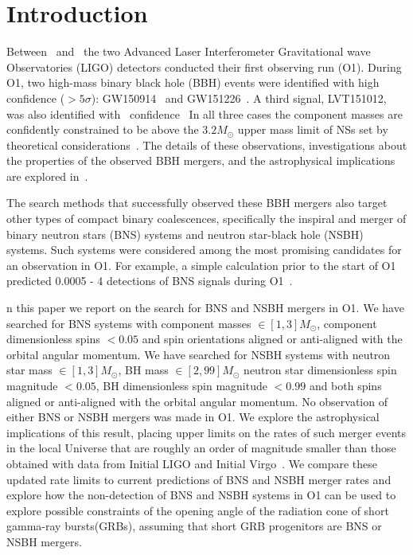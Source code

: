 

\section{Introduction}
Between \OoneSTART\ and \OoneEND\, the two Advanced Laser Interferometer Gravitational wave Observatories (LIGO) detectors conducted their first observing run (\ac{O1}).
During \ac{O1}, two high-mass binary black hole (\ac{BBH}) events
were identified with high confidence ($> 5 \sigma$): GW150914~\citep{Abbott:2016blz} and
GW151226~\citep{Abbott:2016nmj}. A third signal, LVT151012, was
also identified with \LVBLAHsignificance\ confidence~\citep{TheLIGOScientific:2016pea, TheLIGOScientific:2016qqj}
In all three cases the component masses are confidently constrained to be above the $3.2M_\odot$ upper mass limit of \acp{NS} set
by theoretical considerations~\citep{Rhoades:1974fn,TheLIGOScientific:2016wfe}.
The details of these observations, investigations about the properties
of the observed \ac{BBH} mergers, and the astrophysical implications are explored
in~\citep{TheLIGOScientific:2016wfe,Abbott:2016nhf,TheLIGOScientific:2016htt,TheLIGOScientific:2016src,TheLIGOScientific:2016pea, Abbott:2016izl}.

The search methods that successfully observed these \ac{BBH} mergers also target other types of compact
binary coalescences, specifically the inspiral and merger of binary neutron stars (\ac{BNS}) systems 
and neutron star-black hole (\ac{NSBH}) systems. Such systems were considered
among the most promising candidates for an observation in \ac{O1}. For example, a simple calculation
prior to the start of O1 predicted 0.0005 - 4 detections of \ac{BNS}
signals during O1~\citep{Aasi:2013wya}.

n this paper we report on the search for \ac{BNS} and \ac{NSBH} mergers in \ac{O1}. We have
searched for \ac{BNS} systems with component masses $\in [1,3] M_{\odot}$, component dimensionless
spins $< 0.05$ and spin orientations aligned or anti-aligned with the orbital angular momentum.
We have searched for \ac{NSBH} systems with neutron star mass $\in [1,3] M_{\odot}$,
\ac{BH} mass $\in [2,99] M_{\odot}$ neutron star dimensionless spin magnitude $< 0.05$,
\ac{BH} dimensionless spin magnitude $<0.99$ and both spins
aligned or anti-aligned with the orbital angular momentum.
No observation of
either \ac{BNS} or \ac{NSBH} mergers was made in \ac{O1}. We explore the astrophysical implications
of this result, placing upper limits on the rates of such merger events in the
local Universe that
are roughly an order of magnitude smaller than those obtained with data from Initial \ac{LIGO}
and Initial Virgo~\citep{Abbott:2007kv,Acernese:2008zzf,Colaboration:2011np}.
We compare these updated rate limits to current predictions of \ac{BNS} and
\ac{NSBH} merger rates and explore how the non-detection of \ac{BNS} and \ac{NSBH} systems in \ac{O1} can be used
to explore possible constraints of the opening angle of the radiation cone of short gamma-ray bursts(\acp{GRB}),
assuming that short \ac{GRB} progenitors are \ac{BNS} or \ac{NSBH} mergers.

